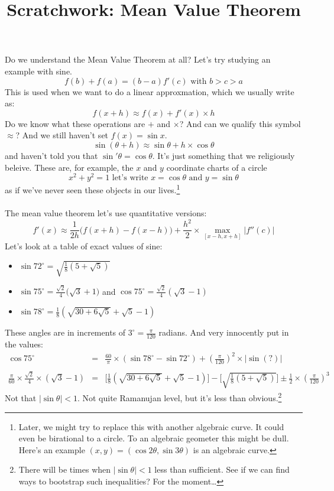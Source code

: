 \documentclass[12pt]{article}
\title{Scratchwork: Mean Value Theorem}
\date{}
\begin{document}

\sffamily

\maketitle

\noindent Do we understand the Mean Value Theorem at all? Let's try studying an example with sine. 
$$ f(b) + f(a) = (b-a)f'(c) \text{ with } b > c > a $$
This is used when we want to do a linear approxmation, which we usually write as:
$$ f(x+h) \approx f(x) + f'(x)\times h$$
Do we know what these operations are $+$ and $\times$?  And can we qualify this symbol $\approx$? And we still haven't set $f(x) = \sin x$.
$$ \sin (\theta +h) \approx \sin \theta + h \times \cos \theta $$
and haven't told you that $\sin'\theta = \cos \theta$.  It's just something that we religiously beleive.  These are, for example, the $x$ and $y$ coordinate charts of a circle
$$ x^2 + y^2 = 1 \text{ let's write } x = \cos \theta \text{ and } y = \sin \theta $$
as if we've never seen these objects in our lives.\footnote{Later, we might try to replace this with another algebraic curve.  It could even be birational to a circle.  To an algebraic geometer this might be dull.  Here's an example $(x,y) = (\cos 2\theta, \sin 3\theta)$ is an algebraic curve.} \\ \\
The mean value theorem let's use quantitative versions:
$$ f'(x) \approx \frac{1}{2h}\big( f(x+h) - f(x-h) \big) + \frac{h^2}{2} \times \max_{[x-h , x+h]} |f''(c)|$$
Let's look at a table of exact values of sine:
\begin{itemize}
\item $ \sin 72^\circ = \sqrt{\frac{1}{8}(5 + \sqrt{5})}$
\item $ \sin 75^\circ = \frac{\sqrt{2}}{4} \big( \sqrt{3}+1 \big)$ and $ \cos 75^\circ = \frac{\sqrt{2}}{4} (\sqrt{3}-1) $
\item $ \sin 78^\circ = \frac{1}{8}(\sqrt{30 + 6 \sqrt{5}} + \sqrt{5}-1)$
\end{itemize}
These angles are in increments of $3^\circ  = \frac{\pi}{120}$ radians.  And very innocently put in the values:
\begin{eqnarray*}
\cos 75^\circ &=& \frac{60}{\pi}\times (\sin 78^\circ - \sin 72^\circ) + (\frac{\pi}{120})^2 \times |\sin(?)| \\ \\
\frac{\pi}{60} \times \frac{\sqrt{2}}{4} \times (\sqrt{3}-1) &=&   \Big[\frac{1}{8}(\sqrt{30 + 6 \sqrt{5}} + \sqrt{5}-1)\Big]
- \Big[\sqrt{\frac{1}{8}(5 + \sqrt{5})}\Big]  \pm \frac{1}{2} \times (\frac{\pi}{120})^3
\end{eqnarray*}
Not that $|\sin \theta| < 1$. Not quite Ramanujan level, but it's less than obvious.\footnote{There will be times when $|\sin \theta| < 1$ less than sufficient.  See if we can find ways to bootstrap such inequalities?  For the moment\dots}
\end{document}
